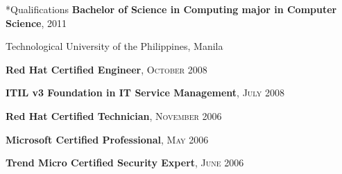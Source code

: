 \documentclass[10pt, a4paper, final]{article}
\begin{document}
\begin{minipage}[t]{0.32\linewidth}
  \begin{section}*{Qualifications}
    \vspace{0.25em}
    \textbf{Bachelor of Science in Computing major in Computer Science}, \textsc{2011}

    Technological University of the Philippines, Manila
    
    \vspace{1em}

    \textbf{Red Hat Certified Engineer}, \textsc{October 2008}

    \textbf{ITIL v3 Foundation in IT Service Management}, \textsc{July 2008}

    \textbf{Red Hat Certified Technician}, \textsc{November 2006}

    \textbf{Microsoft Certified Professional}, \textsc{May 2006}

    \textbf{Trend Micro Certified Security Expert}, \textsc{June 2006}


\end{section}
\end{minipage}
\end{document}
